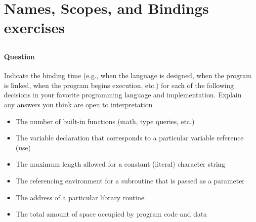 \documentclass[5pt]{article}
\begin{document}
\maketitle

\setcounter{section}{2}
\section{Names, Scopes, and Bindings exercises}


\newcommand{\Subsection}[1]{\Subsection{#1} \setcounter{figure}{3}}

 

\subsection{}

\paragraph{Question}

Indicate the binding time (e.g., when the language is designed, when the
program is linked, when the program begins execution, etc.) for each of the
following decisions in your favorite programming language and implementation.
Explain any answers you think are open to interpretation

\begin{itemize}
\item The number of built-in functions (math, type queries, etc.)
\item The variable declaration that corresponds to a particular variable reference (use)
\item The maximum length allowed for a constant (literal) character string
\item The referencing environment for a subroutine that is passed as a parameter
\item The address of a particular library routine
\item The total amount of space occupied by program code and data


\end{itemize}
\end{document}
